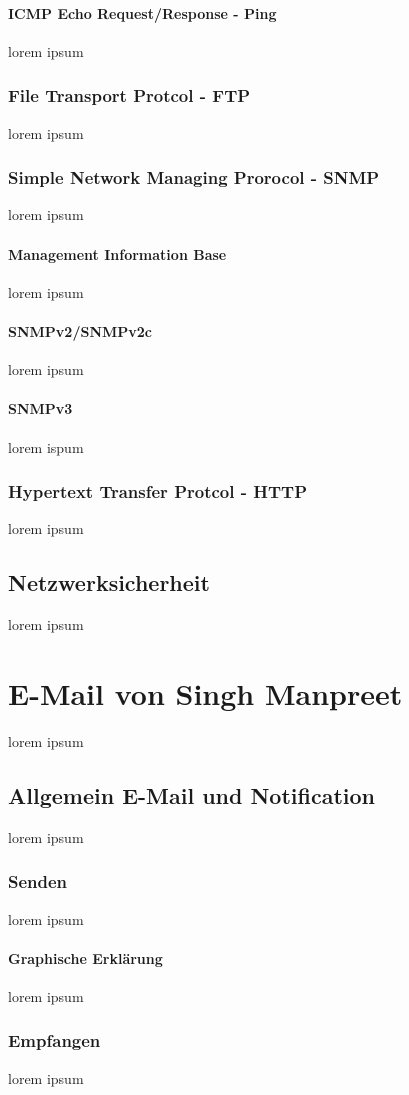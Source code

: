 \documentclass[12pt,a4paper]{report}
\begin{document}
\paragraph{ICMP Echo Request/Response - Ping}
lorem ipsum
\subsubsection{File Transport Protcol - FTP}
lorem ipsum
\subsubsection{Simple Network Managing Prorocol - SNMP}
lorem ipsum
\paragraph{Management Information Base}
lorem ipsum
\paragraph{SNMPv2/SNMPv2c}
lorem ipsum
\paragraph{SNMPv3}
lorem ispum
\subsubsection{Hypertext Transfer Protcol - HTTP}
lorem ipsum
\subsection{Netzwerksicherheit}
lorem ipsum

\section{E-Mail von Singh Manpreet}
lorem ipsum
\subsection{Allgemein E-Mail und Notification}
lorem ipsum
\subsubsection{Senden}
lorem ipsum
\paragraph{Graphische Erklärung}
lorem ipsum
\subsubsection{Empfangen}
lorem ipsum
\end{document}
